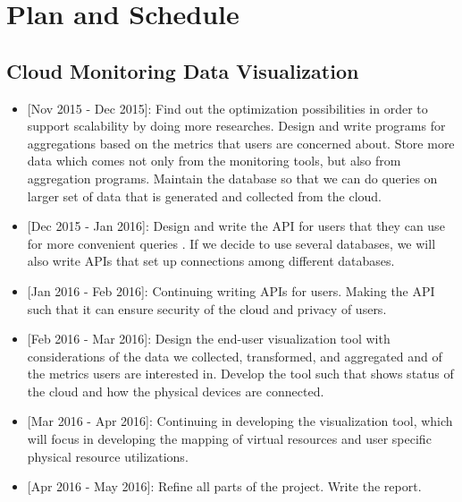 \section{Plan and Schedule}
\label{sec:Plan}



\subsection{Cloud Monitoring Data Visualization}
\begin{itemize}
\item{[Nov 2015 - Dec 2015]:} Find out the optimization possibilities in order to support scalability by doing more researches. Design and write programs for aggregations based on the metrics that users are concerned about. Store more data which comes not only from the monitoring tools, but also from aggregation programs. Maintain the database so that we can do queries on larger set of data that is generated and collected from the cloud.  
\item{[Dec 2015 - Jan 2016]:} Design and write the API for users that they can use for more convenient queries . If we decide to use several databases, we will also write APIs that set up connections among different databases. 
\item{[Jan 2016 - Feb 2016]:} Continuing writing APIs for users. Making the API such that it can ensure security of the cloud and privacy of users. 
\item{[Feb 2016 - Mar 2016]:} Design the end-user visualization tool with considerations of the data we collected, transformed, and aggregated and of the metrics users are interested in. Develop the tool such that shows status of the cloud and how the physical devices are connected.  
\item{[Mar 2016 - Apr 2016]:} Continuing in developing the visualization tool, which will focus in developing the mapping of virtual resources and user specific physical resource utilizations. 
\item{[Apr 2016 - May 2016]:} Refine all parts of the project. Write the report.
\end{itemize}
